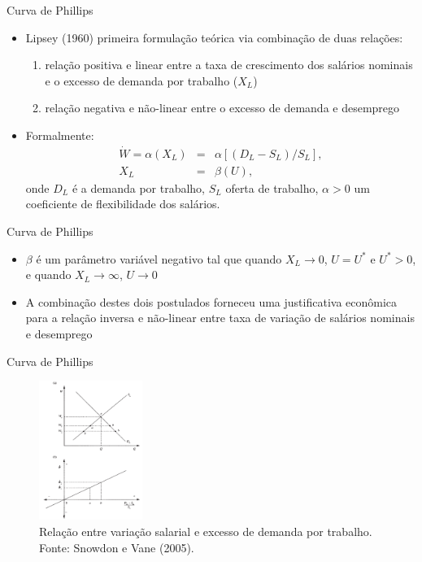 \documentclass[10pt]{beamer}
\begin{document}
\begin{frame}{Curva de Phillips}
    \begin{itemize}
        \item Lipsey (1960) primeira formulação teórica via combinação de duas relações:
        \bigskip
        \begin{enumerate}
            \item relação positiva e linear entre a taxa de crescimento dos salários nominais e o excesso de demanda por trabalho ($X_L$)
            \medskip
            \item relação negativa e não-linear entre o excesso de demanda e desemprego
        \end{enumerate}
        \bigskip
        \item Formalmente:
        \begin{eqnarray}
            \dot{W} = \alpha(X_L) &=& \alpha[(D_L - S_L)/S_L], \label{eq4} \\
            X_L &=& \beta(U), \label{eq5}
        \end{eqnarray}
        onde $D_L$ é a demanda por trabalho, $S_L$ oferta de trabalho, $\alpha > 0$ um coeficiente de flexibilidade dos salários.
    \end{itemize}
\end{frame}

\begin{frame}{Curva de Phillips}
    \begin{itemize}
        \item $\beta$ é um parâmetro variável negativo tal que quando $X_L \to 0$, $U = U^*$ e $U^*>0$, e quando $X_L \to \infty$, $U \to 0$
        \bigskip
        \item A combinação destes dois postulados forneceu uma justificativa econômica para a relação inversa e não-linear entre taxa de variação de salários nominais e desemprego
    \end{itemize}
\end{frame}

\begin{frame}{Curva de Phillips}
    \begin{figure}
        \centering
        \includegraphics[width=0.3\textwidth]{./figures/aula8_fig3.PNG}
        \caption{Relação entre variação salarial e excesso de demanda por trabalho. Fonte: Snowdon e Vane (2005).}
        \label{fig11}
    \end{figure}
\end{frame}
\end{document}
